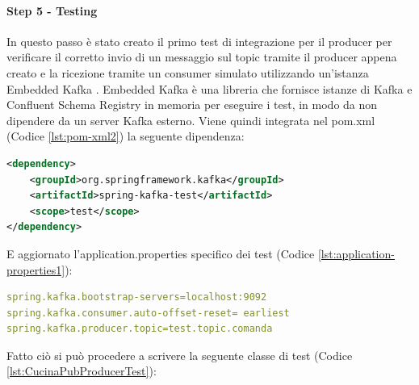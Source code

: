 \paragraph{Step 5 - Testing}
In questo passo è stato creato il primo test di integrazione per il producer per verificare il corretto invio di un messaggio sul topic tramite il producer appena creato e la ricezione tramite un consumer simulato utilizzando un'istanza Embedded Kafka \cite{TestingKafka}.
Embedded Kafka è una libreria che fornisce istanze di Kafka e Confluent Schema Registry in memoria per eseguire i test, in modo da non dipendere da un server Kafka esterno.
Viene quindi integrata nel pom.xml (Codice \vref{lst:pom-xml2}) la seguente dipendenza:
\begin{lstlisting}[language=XML, caption={Aggiornamento dipendenze nel pom.xml per includere spring-kafka-test}, label=lst:pom-xml2]
<dependency>
    <groupId>org.springframework.kafka</groupId>
    <artifactId>spring-kafka-test</artifactId>
    <scope>test</scope>
</dependency>
\end{lstlisting}
E aggiornato l’application.properties specifico dei test  (Codice \vref{lst:application-properties1}):
\begin{lstlisting}[language=yaml, caption={Aggiornamento del file `application.properties` di test per il producer kafka}, label=lst:application-properties1]
spring.kafka.bootstrap-servers=localhost:9092
spring.kafka.consumer.auto-offset-reset= earliest
spring.kafka.producer.topic=test.topic.comanda
\end{lstlisting}
Fatto ciò si può procedere a scrivere la seguente classe di test (Codice \vref{lst:CucinaPubProducerTest}):
